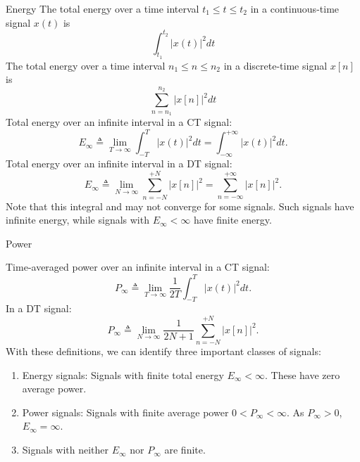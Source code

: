 \begin{frame}[allowframebreaks]{Energy}
    The total energy over a time interval $t_1 \leq t \leq t_2$ in a continuous-time signal $x(t)$ is
    \begin{equation*}
        \int_{t_1}^{t_2}|x(t)|^2dt
    \end{equation*}
    The total energy over a time interval $n_1 \leq n \leq n_2$ in a discrete-time signal $x[n]$ is
    \begin{equation*}
        \sum_{n= n_1}^{n_2}|x[n]|^2dt
    \end{equation*}
    Total energy  over an infinite interval in a CT signal:
    \begin{equation}
        E_\infty \triangleq \lim_{T \rightarrow \infty} \int_{-T}^{T}|x(t)|^2dt =  \int_{-\infty}^{+\infty}|x(t)|^2dt.
    \end{equation}
    Total energy  over an infinite interval in a DT signal:
    \begin{equation}
      E_\infty \triangleq \lim_{N \rightarrow \infty} \sum_{n = -N}^{+N}|x[n]|^2 =  \sum_{n=-\infty}^{+\infty}|x[n]|^2.
    \end{equation}
    Note that this integral and may not converge for some signals. Such signals have infinite energy, while signals with $E_\infty < \infty$ have finite energy.
\end{frame}


\begin{frame}{Power}

    Time-averaged power over an infinite interval in a CT signal:
    \begin{equation}
        P_\infty \triangleq \lim_{T \rightarrow \infty} \frac{1}{2T}\int_{-T}^{T}|x(t)|^2dt.
    \end{equation}
    In a DT signal:
    \begin{equation}
      P_\infty \triangleq \lim_{N \rightarrow \infty} \frac{1}{2N+1}\sum_{n = -N}^{+N}|x[n]|^2.
    \end{equation}
    With these definitions, we can identify three important classes of signals:
    {
    \begin{enumerate}
        \item Energy signals: Signals with finite total energy $E_\infty < \infty$. These have zero average power.
        \item Power signals: Signals with finite average power $0 < P_\infty < \infty$. As $P_\infty > 0$, $E_\infty = \infty$.
        \item Signals with neither $E_\infty$ nor $P_\infty$ are finite.
    \end{enumerate}
    }
\end{frame}


